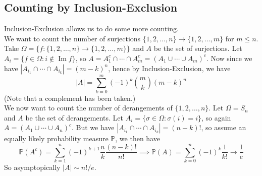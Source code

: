 \subsection{Counting by Inclusion-Exclusion}
Inclusion-Exclusion allows us to do some more counting.\\
We want to count the number of surjections $\{1,2,\ldots,n\}\to\{1,2,\ldots,m\}$ for $m\le n$.
Take $\Omega=\{f:\{1,2,\ldots,n\}\to\{1,2,\ldots,m\}\}$ and $A$ be the set of surjections.
Let $A_i=\{f\in\Omega:i\notin \operatorname{Im}f\}$, so $A=A_1^c\cap\cdots\cap A_m^c=(A_1\cup\cdots\cup A_m)^c$.
Now since we have $|A_{i_1}\cap\cdots\cap A_{i_k}|=(m-k)^n$, hence by Inclusion-Exclusion, we have
$$|A|=\sum_{k=0}^m(-1)^k\binom{m}{k}(m-k)^n$$
(Note that a complement has been taken.)\\
We now want to count the number of derangements of $\{1,2,\ldots,n\}$.
Let $\Omega=S_n$ and $A$ be the set of derangements.
Let $A_i=\{\sigma\in\Omega:\sigma(i)=i\}$, so again $A=(A_1\cup\cdots\cup A_n)^c$.
But we have $|A_{i_1}\cap\cdots\cap A_{i_k}|=(n-k)!$, so assume an equally likely probability measure $\mathbb P$, we then have
$$\mathbb P(A^c)=\sum_{k=1}^n(-1)^{k+1}\frac{n}{k}\frac{(n-k)!}{n!}\implies \mathbb P(A)=\sum_{k=0}^n(-1)^k\frac{1}{k!}\to \frac{1}{e}$$
So asymptopically $|A|\sim n!/e$.
